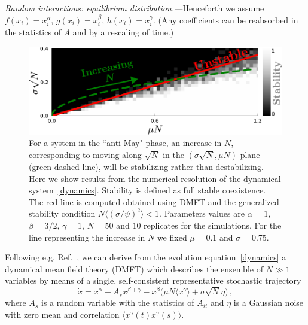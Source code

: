 \emph{Random interactions: equilibrium distribution.---}Henceforth we assume $f(x_i)=x_i^{\alpha}$, $g(x_i)=x_i^{\beta}$, $h(x_i)=x_i^{\gamma}$. 
(Any coefficients can be reabsorbed in the statistics of $A$ and by a rescaling of time.)
\begin{figure}[t!]
    \includegraphics[width=.45\textwidth]{figs/beta1_5-S50-N10-diversity-increase.pdf}
    \caption{For a system in the ``anti-May" phase, an increase in $N$,
    corresponding to moving along $\sqrt{N}$ in the $(\sigma \sqrt{N},\mu N)$ plane (green dashed line), will be stabilizing rather than destabilizing.
    Here we show results from the numerical resolution of the dynamical system~\eqref{dynamics}. Stability is defined as full stable coexistence. The red line is computed obtained using DMFT and the generalized stability condition $N\langle (\sigma/\psi)^2\rangle < 1$.
    Parameters values are $\alpha=1$, $\beta=3/2$,
    $\gamma=1$, $N=50$ and $10$ replicates for the simulations. For the line representing the increase in $N$ we fixed $\mu=0.1$ and $\sigma=0.75$.}
    \label{fig: stability line + sims}
\end{figure}
Following e.g. Ref.~\cite{Roy2019}, we can derive from the evolution equation~\eqref{dynamics} a dynamical mean field theory (DMFT) 
which describes the ensemble of $N\gg 1$ variables
by means of a single, self-consistent representative stochastic trajectory
\begin{equation}
    \dot{x} = x^{\alpha}-A_sx^{\beta+\gamma}-x^{\beta}\big( \mu N \langle x^{\gamma}\rangle + \sigma \sqrt{N} \eta\big) \, ,
\label{eq: dmft}
\end{equation}
where $A_s$ is a random variable with the statistics of $A_{ii}$ and $\eta$ is a Gaussian noise with zero mean and correlation $\langle x^{\gamma}(t)x^{\gamma}(s)\rangle$. 
